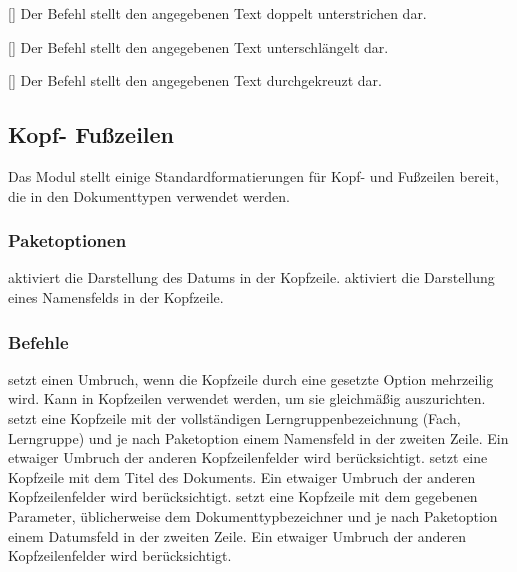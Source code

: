 \begin{commands}
    [] Der Befehl  stellt den angegebenen Text doppelt unterstrichen dar.
\begin{sidebyside}[gobble=4]
\end{sidebyside}

    [] Der Befehl  stellt den angegebenen Text unterschlängelt dar.
\begin{sidebyside}[gobble=4]
\end{sidebyside}

    [] Der Befehl  stellt den angegebenen Text durchgekreuzt dar.
\begin{sidebyside}[gobble=4]
\end{sidebyside}

\end{commands}

\subsection{Kopf- Fußzeilen}
    Das Modul stellt einige Standardformatierungen für Kopf- und Fußzeilen bereit, die in den Dokumenttypen verwendet werden.

\subsubsection{Paketoptionen}
\begin{options}
     aktiviert die Darstellung des Datums in der Kopfzeile.
     aktiviert die Darstellung eines Namensfelds in der Kopfzeile.
\end{options}

\subsubsection{Befehle}
\begin{commands}
     setzt einen Umbruch, wenn die Kopfzeile durch eine gesetzte Option mehrzeilig wird. Kann in Kopfzeilen verwendet werden, um sie gleichmäßig auszurichten.
     setzt eine Kopfzeile mit der vollständigen Lerngruppenbezeichnung (Fach, Lerngruppe) und je nach Paketoption einem Namensfeld in der zweiten Zeile. Ein etwaiger Umbruch der anderen Kopfzeilenfelder wird berücksichtigt.
     setzt eine Kopfzeile mit dem Titel des Dokuments. Ein etwaiger Umbruch der anderen Kopfzeilenfelder wird berücksichtigt.
     setzt eine Kopfzeile mit dem gegebenen Parameter, üblicherweise dem Dokumenttypbezeichner und je nach Paketoption einem Datumsfeld in der zweiten Zeile. Ein etwaiger Umbruch der anderen Kopfzeilenfelder wird berücksichtigt.
\end{commands}

